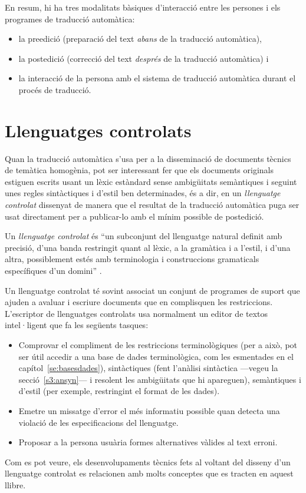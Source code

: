 En resum, hi ha tres modalitats bàsiques d'interacció entre les
persones i els programes de traducció automàtica:
\begin{itemize}
\item la preedició (preparació del text \emph{abans} de la traducció
  automàtica),
\item la postedició (correcció del text \emph{després} de la
  traducció automàtica) i
\item la interacció de la persona amb el sistema de traducció
  automàtica durant el procés de traducció.
\end{itemize}


\section{Llenguatges controlats}
\label{ss:llecon}

Quan la traducció automàtica s'usa per a la disseminació de documents
tècnics de temàtica homogènia, pot ser interessant fer que els
documents originals estiguen escrits usant un lèxic estàndard sense
ambigüitats semàn\-ti\-ques i seguint unes regles sintàctiques i
d'estil ben determinades, és a dir, en un \emph{llenguatge controlat}
\citep{wojcik96u,arnold94b} dissenyat de manera que el resultat de la
traducció automàtica puga ser usat directament per a publicar-lo amb
el mínim possible de postedició.

Un \emph{llenguatge controlat} és ``un subconjunt del llenguatge natural
definit amb precisió, d'una banda restringit quant al lèxic, a la
gramàtica i a l'estil, i d'una altra, possiblement estés amb
terminologia i construccions gramaticals específiques d'un domini''
\citep{huijsen98u}. 


  Un llenguatge controlat té sovint associat un conjunt de programes
  de suport que ajuden a avaluar i escriure documents que en
  complisquen les restriccions. L'escriptor de llenguatges controlats
  usa normalment un editor de textos intel·ligent que fa les següents
  tasques:
\begin{itemize}
\item Comprovar el compliment de les restriccions terminològiques (per
  a això, pot ser útil accedir a una base de dades terminològica, com
  les esmentades en el capítol~\ref{se:basesdades}), sintàctiques
  (fent l'anàlisi sintàctica ---vegeu la secció~\ref{s3:ansyn}--- i
  resolent les ambigüitats que hi apareguen), semàntiques i d'estil
  (per exemple, restringint el format de les dades).
\item Emetre un missatge d'error el més informatiu possible quan
  detecta una violació de les especificacions del llenguatge.
\item Proposar a la persona usuària formes alternatives vàlides al
  text erroni.
\end{itemize}
Com es pot veure, els desenvolupaments tècnics fets al voltant del
disseny d'un llenguatge controlat es relacionen amb molts conceptes
que es tracten en aquest llibre.


